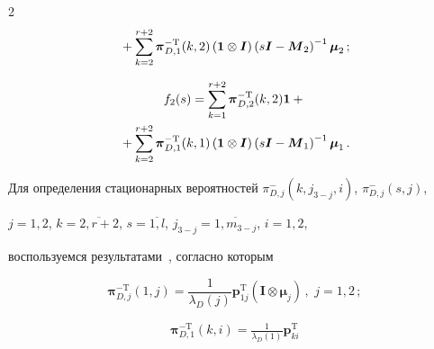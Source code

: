 \begin{multicols}{2}
\begin{multline}
{}

+\sum\limits_{k=2}^{r+2}\boldsymbol{\pi}_{D,1}^{-\mathrm{T}}(k,2)

\left({\bf{1}}\otimes\boldsymbol{I}\right)

\left(s\boldsymbol{I}-\boldsymbol{M}_2\right)^{-1}\boldsymbol{\mu}_2\,;

\end{multline}



\vspace*{-6pt}



\noindent

\begin{multline}

\label{eq:17}

f_2(s)=\sum\limits_{k=1}^{r+2}\boldsymbol{\pi}_{D,2}^{-\mathrm{T}}(k,2) \boldsymbol{1}+{}\\

{}+\sum\limits_{k=2}^{r+2}\boldsymbol{\pi}_{D,1}^{-\mathrm{T}}(k,1)

\left({\bf{1}}\otimes\boldsymbol{I}\right)

\left(s\boldsymbol{I}-\boldsymbol{M}_1\right)^{-1}\boldsymbol{\mu}_1\,.

\end{multline}



Для определения стационарных вероятностей $\pi_{D,j}^{-}(k,j_{3-j},i)$, $\pi_{D,j}^{-}(s,j)$, 

$j=1,2$, $k=\overline{2,r+2}$, $s=\overline{1,l}$, $j_{3-j}=\overline{1,m_{3-j}}$, $i=1,2$, 

воспользуемся результатами~\cite{4mat}, согласно которым

\begin{equation}

\label{eq:18}

\boldsymbol{\pi}_{D,j}^{-\mathrm{T}}(1,j)=\frac{1}{\lambda_{D}(j)}\boldsymbol{p}_{1j}^{\mathrm{T}}

\left(\boldsymbol{I}\otimes\boldsymbol{\mu}_j\right)\,,\,\, j=1,2\,;

\end{equation}

\begin{multline}

\label{eq:19}

\boldsymbol{\pi}_{D,1}^{-\mathrm{T}}(k,i)=\frac{1}{\lambda_{D}(1)}\boldsymbol{p}_{ki}^{\mathrm{T}}


\end{multline}
\end{multicols}
